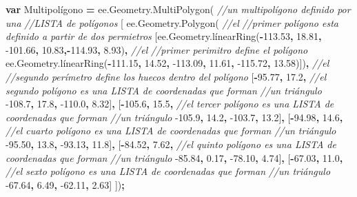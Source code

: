 \documentclass[
]{article}
\newenvironment{Shaded}{\begin{snugshade}}{\end{snugshade}}
\newcommand{\AttributeTok}[1]{\textcolor[rgb]{0.77,0.63,0.00}{#1}}
\newcommand{\CommentTok}[1]{\textcolor[rgb]{0.56,0.35,0.01}{\textit{#1}}}
\newcommand{\FloatTok}[1]{\textcolor[rgb]{0.00,0.00,0.81}{#1}}
\newcommand{\KeywordTok}[1]{\textcolor[rgb]{0.13,0.29,0.53}{\textbf{#1}}}
\newcommand{\NormalTok}[1]{#1}
\newcommand{\OperatorTok}[1]{\textcolor[rgb]{0.81,0.36,0.00}{\textbf{#1}}}
\newcommand{\VariableTok}[1]{\textcolor[rgb]{0.00,0.00,0.00}{#1}}
\begin{document}
\begin{Shaded}
\begin{Highlighting}[]
\KeywordTok{var}\NormalTok{ Multipolígono }\OperatorTok{=} \VariableTok{ee}\NormalTok{.}\VariableTok{Geometry}\NormalTok{.}\AttributeTok{MultiPolygon}\NormalTok{(  }\CommentTok{//un multipolígono definido por una }
\CommentTok{//LISTA de polígonos}
\NormalTok{  [}
    \VariableTok{ee}\NormalTok{.}\VariableTok{Geometry}\NormalTok{.}\AttributeTok{Polygon}\NormalTok{(                                                        }\CommentTok{//el }
\CommentTok{//primer polígono esta definido a partir de dos permietros }
\NormalTok{      [}\VariableTok{ee}\NormalTok{.}\VariableTok{Geometry}\NormalTok{.}\AttributeTok{línearRing}\NormalTok{(}\OperatorTok{-}\FloatTok{113.53}\OperatorTok{,} \FloatTok{18.81}\OperatorTok{,} \FloatTok{-101.66}\OperatorTok{,} \FloatTok{10.83}\OperatorTok{,-}\FloatTok{114.93}\OperatorTok{,} \FloatTok{8.93}\NormalTok{)}\OperatorTok{,}    \CommentTok{//el }
\CommentTok{//primer perimitro define el polígono }
      \VariableTok{ee}\NormalTok{.}\VariableTok{Geometry}\NormalTok{.}\AttributeTok{línearRing}\NormalTok{(}\OperatorTok{-}\FloatTok{111.15}\OperatorTok{,} \FloatTok{14.52}\OperatorTok{,} \FloatTok{-113.09}\OperatorTok{,} \FloatTok{11.61}\OperatorTok{,} \FloatTok{-115.72}\OperatorTok{,} \FloatTok{13.58}\NormalTok{)])}\OperatorTok{,} \CommentTok{//el }
\CommentTok{//segundo perímetro define los huecos dentro del polígono}
\NormalTok{    [}\OperatorTok{-}\FloatTok{95.77}\OperatorTok{,} \FloatTok{17.2}\OperatorTok{,}          \CommentTok{//el segundo polígono es una LISTA de coordenadas que forman }
\CommentTok{//un triángulo}
      \FloatTok{-108.7}\OperatorTok{,} \FloatTok{17.8}\OperatorTok{,}
      \FloatTok{-110.0}\OperatorTok{,} \FloatTok{8.32}\NormalTok{]}\OperatorTok{,}
\NormalTok{    [}\OperatorTok{-}\FloatTok{105.6}\OperatorTok{,} \FloatTok{15.5}\OperatorTok{,}          \CommentTok{//el tercer polígono es una LISTA de coordenadas que forman }
\CommentTok{//un triángulo}
      \FloatTok{-105.9}\OperatorTok{,} \FloatTok{14.2}\OperatorTok{,}
      \FloatTok{-103.7}\OperatorTok{,} \FloatTok{13.2}\NormalTok{]}\OperatorTok{,}
\NormalTok{    [}\OperatorTok{-}\FloatTok{94.98}\OperatorTok{,} \FloatTok{14.6}\OperatorTok{,}          \CommentTok{//el cuarto polígono es una LISTA de coordenadas que forman }
\CommentTok{//un triángulo}
      \FloatTok{-95.50}\OperatorTok{,} \FloatTok{13.8}\OperatorTok{,}
      \FloatTok{-93.13}\OperatorTok{,} \FloatTok{11.8}\NormalTok{]}\OperatorTok{,}
\NormalTok{    [}\OperatorTok{-}\FloatTok{84.52}\OperatorTok{,} \FloatTok{7.62}\OperatorTok{,}          \CommentTok{//el quinto polígono es una LISTA de coordenadas que forman }
\CommentTok{//un triángulo}
      \FloatTok{-85.84}\OperatorTok{,} \FloatTok{0.17}\OperatorTok{,}
      \FloatTok{-78.10}\OperatorTok{,} \FloatTok{4.74}\NormalTok{]}\OperatorTok{,}
\NormalTok{    [}\OperatorTok{-}\FloatTok{67.03}\OperatorTok{,} \FloatTok{11.0}\OperatorTok{,}          \CommentTok{//el sexto polígono es una LISTA de coordenadas que forman }
\CommentTok{//un triángulo}
      \FloatTok{-67.64}\OperatorTok{,} \FloatTok{6.49}\OperatorTok{,}
      \FloatTok{-62.11}\OperatorTok{,} \FloatTok{2.63}\NormalTok{]}
\NormalTok{      ])}\OperatorTok{;}
\end{Highlighting}
\end{Shaded}
\end{document}
